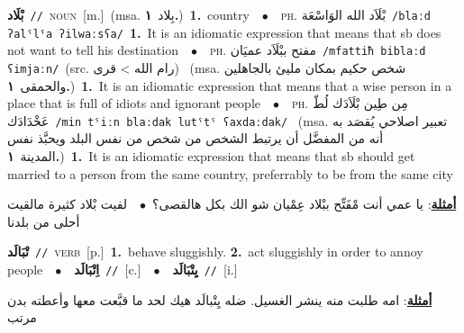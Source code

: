 \documentclass[10pt,a4paper,twoside]{article} %
\begin{document}
\begin{multicols}{2}
{\setlength\topsep{0pt}\textbf{\foreignlanguage{arabic}{بْلَاد}}\ {\color{gray}\texttt{//}\color{black}}\ \textsc{noun}\ [m.]\ \color{gray}(msa. \foreignlanguage{arabic}{بِلاد}~\foreignlanguage{arabic}{\textbf{١.}})\color{black}\ \textbf{1.}~country\ \ $\bullet$\ \ \textsc{ph.} \color{gray} \foreignlanguage{arabic}{بْلَاَد الله الوَاسْعَة}\color{black}\ {\color{gray}\texttt{/{\sffamily blaːd ʔalˤlˤa ʔilwaːsʕa}/}\color{black}}\ \textbf{1.}~It is an idiomatic expression that means that sb does not want to tell his destination\ \ $\bullet$\ \ \textsc{ph.} \color{gray} \foreignlanguage{arabic}{مفتح ببْلَاَد عميَان}\color{black}\ {\color{gray}\texttt{/{\sffamily mfattiħ biblaːd ʕimjaːn}/}\color{black}}\ \color{gray}(src. \foreignlanguage{arabic}{رام الله > قرى})\color{black}\ \color{gray} (msa. \foreignlanguage{arabic}{شخص حكيم بمكان مليئ بالجاهلين والحمقى}~\foreignlanguage{arabic}{\textbf{١.}})\color{black}\ \textbf{1.}~It is an idiomatic expression that means that a wise person in a place that is full of idiots and ignorant people\ \ $\bullet$\ \ \textsc{ph.} \color{gray} \foreignlanguage{arabic}{مِن طِين بْلَاَدَك لُطّ عَخْدَادَك}\color{black}\ {\color{gray}\texttt{/{\sffamily min tˤiːn blaːdak lutˤtˤ ʕaxdaːdak}/}\color{black}}\ \color{gray} (msa. \foreignlanguage{arabic}{تعبير اصلاحي يُقصَد به أنه من المفضَّل أن يرتبط الشخص من شخص من نفس البلد ويحبَّذ نفس المدينة}~\foreignlanguage{arabic}{\textbf{١.}})\color{black}\ \textbf{1.}~It is an idiomatic expression that means  that sb should get married to a person from the same country, preferrably to be from the same city\  \begin{flushright}\color{gray}\foreignlanguage{arabic}{\textbf{\underline{\foreignlanguage{arabic}{أمثلة}}}: يا عمي أنت مْفَتِّح ببْلاد عِمْيان شو الك بكل هالقصى؟\ $\bullet$\ \  لفيت بْلاد كثيرة مالقيت أحلى من بلدنا}\end{flushright}\color{black}} \vspace{2mm}

{\setlength\topsep{0pt}\textbf{\foreignlanguage{arabic}{تْبَالَد}}\ {\color{gray}\texttt{//}\color{black}}\ \textsc{verb}\ [p.]\ \textbf{1.}~behave sluggishly.  \textbf{2.}~act sluggishly in order to annoy people\ \ $\bullet$\ \ \setlength\topsep{0pt}\textbf{\foreignlanguage{arabic}{اِتْبَالَد}}\ {\color{gray}\texttt{//}\color{black}}\ [c.]\ \ $\bullet$\ \ \setlength\topsep{0pt}\textbf{\foreignlanguage{arabic}{يِتْبَالَد}}\ {\color{gray}\texttt{//}\color{black}}\ [i.]\  \begin{flushright}\color{gray}\foreignlanguage{arabic}{\textbf{\underline{\foreignlanguage{arabic}{أمثلة}}}: امه طلبت منه ينشر الغسيل. ضله يِتْبالَد هيك لحد ما قبَّعت معها وأعطته بدن مرتب}\end{flushright}\color{black}} \vspace{2mm}


\end{multicols}
\end{document}
